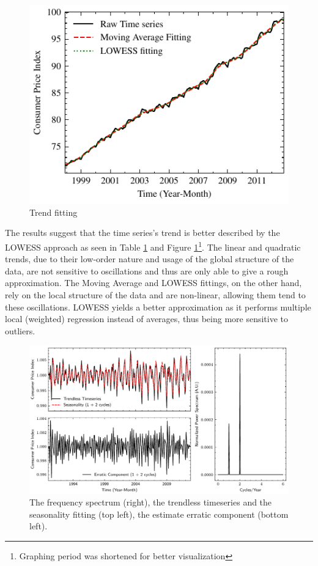 \documentclass[conference]{IEEEtran}
\begin{document}
\begin{figure}[hbtp]
    \centering
    \includegraphics{../figs/trend.pdf}
    \caption{Trend fitting}
    \label{fig:trend}
\end{figure}

The results suggest that the time series's trend is better described by the LOWESS approach as seen in Table \ref{fig:trend} and Figure \ref{fig:trend}\footnote{Graphing period was shortened for better visualization}. The linear and quadratic trends, due to their low-order nature and usage of the global structure of the data, are not sensitive to oscillations and thus are only able to give a rough approximation. The Moving Average and LOWESS fittings, on the other hand, rely on the local structure of the data and are non-linear, allowing them tend to these oscillations. LOWESS yields a better approximation as it performs multiple local (weighted) regression instead of averages, thus being more sensitive to outliers.

\begin{figure}[hbtp]
    \centering
    \includegraphics{../figs/season.pdf}
    \caption{The frequency spectrum (right), the trendless timeseries and the seasonality fitting (top left), the estimate erratic component (bottom left).}
    \label{fig:season}
\end{figure}
\end{document}
